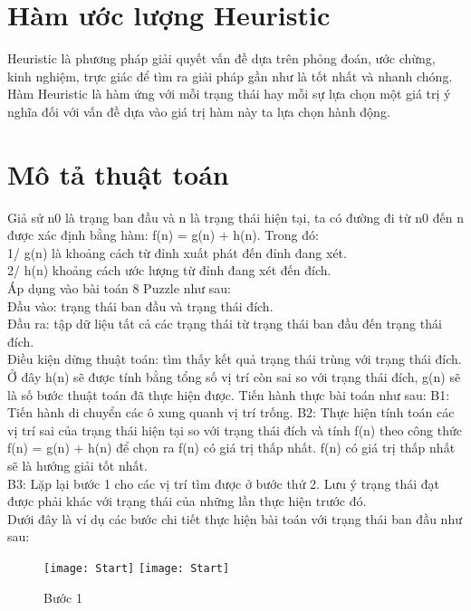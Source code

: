 \section{Hàm ước lượng Heuristic}
Heuristic là phương pháp giải quyết vấn đề dựa trên phỏng đoán, ước chừng, kinh nghiệm, trực giác để tìm ra giải pháp gần như là tốt nhất và nhanh chóng.\\
Hàm Heuristic là hàm ứng với mỗi trạng thái hay mỗi sự lựa chọn một giá trị ý nghĩa đối với vấn đề dựa vào giá trị hàm này ta lựa chọn hành động.

\section{Mô tả thuật toán}
Giả sử n0 là trạng ban đầu và n là trạng thái hiện tại, ta có đường đi từ n0 đến n được xác định bằng hàm: f(n) = g(n) + h(n). Trong đó:\\
1/ g(n) là khoảng cách từ đỉnh xuất phát đến đỉnh đang xét.\\
2/ h(n) khoảng cách ước lượng từ đỉnh đang xét đến đích.\\


Áp dụng vào bài toán 8 Puzzle như sau:\\
Đầu vào: trạng thái ban đầu và trạng thái đích.\\
Đầu ra: tập dữ liệu tất cả các trạng thái từ trạng thái ban đầu đến trạng thái đích.\\
Điều kiện dừng thuật toán: tìm thấy kết quả trạng thái trùng với trạng thái đích.\\

Ở đây h(n) sẽ được tính bằng tổng số vị trí còn sai so với trạng thái đích, g(n) sẽ là số bước thuật toán đã thực hiện được. Tiến hành thực bài toán như sau:
B1: Tiến hành di chuyển các ô xung quanh vị trí trống.
B2: Thực hiện tính toán các vị trí sai của trạng thái hiện tại so với trạng thái đích và tính f(n) theo công thức f(n) = g(n) + h(n) để chọn ra f(n) có giá trị thấp nhất. f(n) có giá trị thấp nhất sẽ là hướng giải tốt nhất. \\
B3: Lặp lại bước 1 cho các vị trí tìm được ở bước thứ 2. Lưu ý trạng thái đạt được phải khác với trạng thái của những lần thực hiện trước đó.\\

Dưới đây là ví dụ các bước chi tiết thực hiện bài toán với trạng thái ban đầu như sau:\\
\begin{figure}[!htbp]
  \begin{center}
    \leavevmode
    \ifpdf
      \texttt{[image: Start]}
    \else
      \texttt{[image: Start]}
    \fi
    \caption{Bước 1}
    \label{FigAir}
   
  \end{center}
\end{figure}
\FloatBarrier

